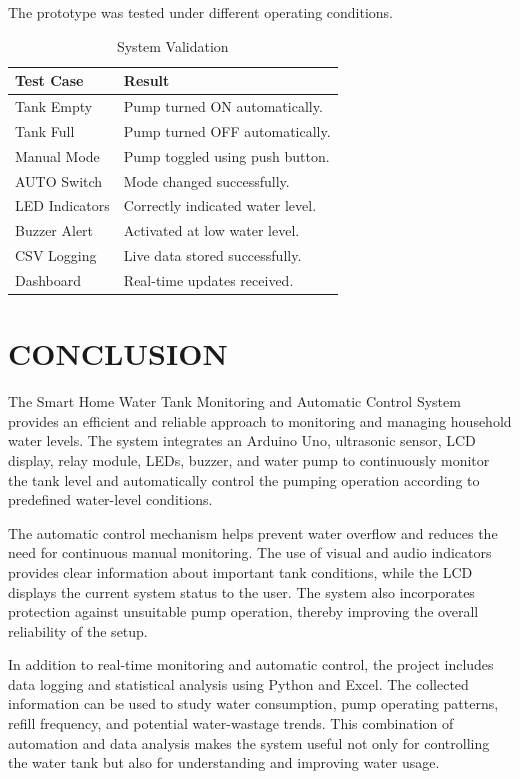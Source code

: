 \documentclass[12pt,a4paper]{article}
\begin{document}
The prototype was tested under different operating conditions.

\begin{table}[H]
\centering
\begin{tabular}{|p{5cm}|p{7cm}|}
\hline
Test Case & Result\\
\hline
Tank Empty & Pump turned ON automatically.\\
Tank Full & Pump turned OFF automatically.\\
Manual Mode & Pump toggled using push button.\\
AUTO Switch & Mode changed successfully.\\
LED Indicators & Correctly indicated water level.\\
Buzzer Alert & Activated at low water level.\\
CSV Logging & Live data stored successfully.\\
Dashboard & Real-time updates received.\\
\hline
\end{tabular}
\caption{System Validation}
\label{tab:validation}
\end{table}

\section{CONCLUSION}

The Smart Home Water Tank Monitoring and Automatic Control System provides an efficient and reliable approach to monitoring and managing household water levels. The system integrates an Arduino Uno, ultrasonic sensor, LCD display, relay module, LEDs, buzzer, and water pump to continuously monitor the tank level and automatically control the pumping operation according to predefined water-level conditions.

The automatic control mechanism helps prevent water overflow and reduces the need for continuous manual monitoring. The use of visual and audio indicators provides clear information about important tank conditions, while the LCD displays the current system status to the user. The system also incorporates protection against unsuitable pump operation, thereby improving the overall reliability of the setup.

In addition to real-time monitoring and automatic control, the project includes data logging and statistical analysis using Python and Excel. The collected information can be used to study water consumption, pump operating patterns, refill frequency, and potential water-wastage trends. This combination of automation and data analysis makes the system useful not only for controlling the water tank but also for understanding and improving water usage.
\end{document}
